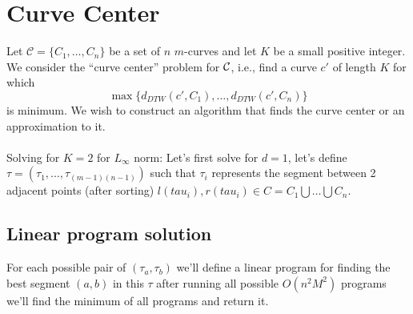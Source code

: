 \documentclass{article}
\theoremstyle{remark}
\theoremstyle{definition}
\begin{document}
\section{Curve Center}
Let $\mathcal{C}  = \{C_1,\ldots,C_n\}$ be a set of $n$ $m$-curves and let $K$ be a small positive integer. We consider the ``curve center'' problem for ${\cal C}$, i.e., find a curve $c'$ of length $K$ for which $$\max \{d_{DTW}(c',C_1),\ldots,d_{DTW}(c',C_n)\}$$ is minimum. We wish to construct an algorithm that finds the curve center or an approximation to it.
\paragraph{}
Solving for $K=2$ for $L_\infty$ norm:
Let's first solve for $d=1$, let's define $\tau=(\tau_1,\ldots, \tau_{(m-1)(n-1)})$ such that $\tau_i$ represents the segment between 2 adjacent points (after sorting) $l(tau_i), r(tau_i)\in C=C_1\bigcup \ldots \bigcup C_n$.

\subsection{Linear program solution}
For each possible pair of $(\tau_a, \tau_b)$ we'll define a linear program for finding the best segment $(a, b)$ in this $\tau$ after running all possible $O(n^2 M^2)$ programs we'll find the minimum of all programs and return it.
\end{document}
